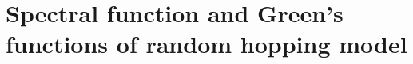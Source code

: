 \documentclass[prx,aps,onecolumn,amsfonts,showpacs,superscriptaddress,preprint,eqsecnum]
{revtex4-1}
\begin{document}

\section{Spectral function and Green's functions of random hopping model \label{App:IC1}} 
\end{document}
